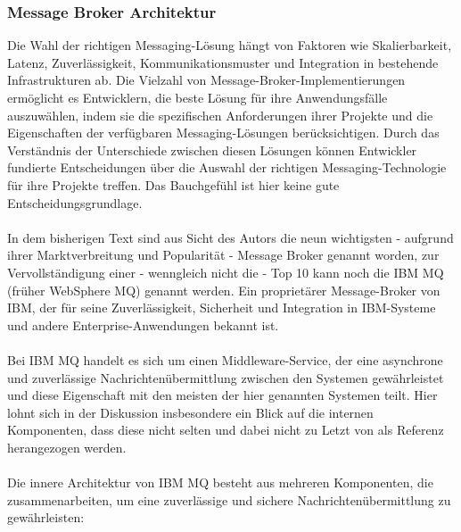 \subsubsection{Message Broker Architektur}

Die Wahl der richtigen Messaging-Lösung hängt von Faktoren wie Skalierbarkeit, Latenz, Zuverlässigkeit, Kommunikationsmuster und Integration in bestehende Infrastrukturen ab. Die Vielzahl von Message-Broker-Implementierungen ermöglicht es Entwicklern, die beste Lösung für ihre Anwendungsfälle auszuwählen, indem sie die spezifischen Anforderungen ihrer Projekte und die Eigenschaften der verfügbaren Messaging-Lösungen berücksichtigen. Durch das Verständnis der Unterschiede zwischen diesen Lösungen können Entwickler fundierte Entscheidungen über die Auswahl der richtigen Messaging-Technologie für ihre Projekte treffen. Das Bauchgefühl ist hier keine gute Entscheidungsgrundlage. 
\\\\
In dem bisherigen Text sind aus Sicht des Autors die neun wichtigsten - aufgrund ihrer Marktverbreitung und Popularität - Message Broker genannt worden, zur Vervollständigung einer - wenngleich nicht die - Top 10 kann noch die IBM MQ (früher WebSphere MQ) genannt werden. Ein proprietärer Message-Broker von IBM, der für seine Zuverlässigkeit, Sicherheit und Integration in IBM-Systeme und andere Enterprise-Anwendungen bekannt ist.
\\\\
Bei IBM MQ handelt es sich um einen Middleware-Service, der eine asynchrone und zuverlässige Nachrichtenübermittlung zwischen den Systemen gewährleistet und diese Eigenschaft mit den meisten der hier genannten Systemen teilt. Hier lohnt sich in der Diskussion insbesondere ein Blick auf die internen Komponenten, dass diese nicht selten und dabei nicht zu Letzt von \cite{tanenbaum2017distributed} als Referenz herangezogen werden.
\\\\
Die innere Architektur von IBM MQ besteht aus mehreren Komponenten, die zusammenarbeiten, um eine zuverlässige und sichere Nachrichtenübermittlung zu gewährleisten:

